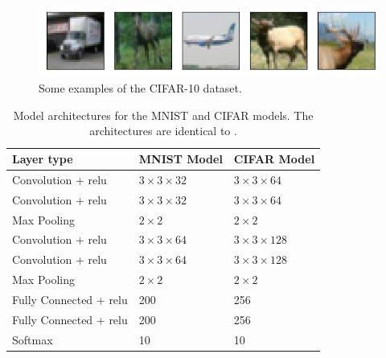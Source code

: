 \begin{figure}
\centering
\includegraphics[width=\textwidth]{Images/cifar.png}
\caption[Some examples of the CIFAR-10 dataset]{Some examples of the CIFAR-10 \cite{cifar} dataset.}
\label{fig:cifar}
\end{figure}

\begin{table}
	\centering
	\caption[Model architectures for the MNIST and CIFAR model]{Model architectures for the MNIST and CIFAR models. The architectures are identical to \cite{cw_attack, defensive_distillation}.}
    \begin{tabular}{lll}\toprule
        Layer type     & MNIST Model &CIFAR Model\\ \midrule
		Convolution + \gls{relu}	&$3 \times 3 \times 32$ &$3\times3\times64$\\
		Convolution + \gls{relu}	&$3 \times 3 \times 32$ &$3\times3\times64$\\
		Max Pooling					&$2 \times2$			&$2\times2$\\
		Convolution + \gls{relu}	&$3 \times 3 \times 64$ &$3\times3\times128$\\
		Convolution + \gls{relu}	&$3 \times 3 \times 64$ &$3\times3\times128$\\
		Max Pooling					&$2 \times2$			&$2\times2$\\
		Fully Connected + \gls{relu}&200					&256\\
		Fully Connected + \gls{relu}&200					&256\\
		Softmax						&10						&10\\
        \bottomrule
    \end{tabular}
    \label{tbl:architectures}
\end{table}

